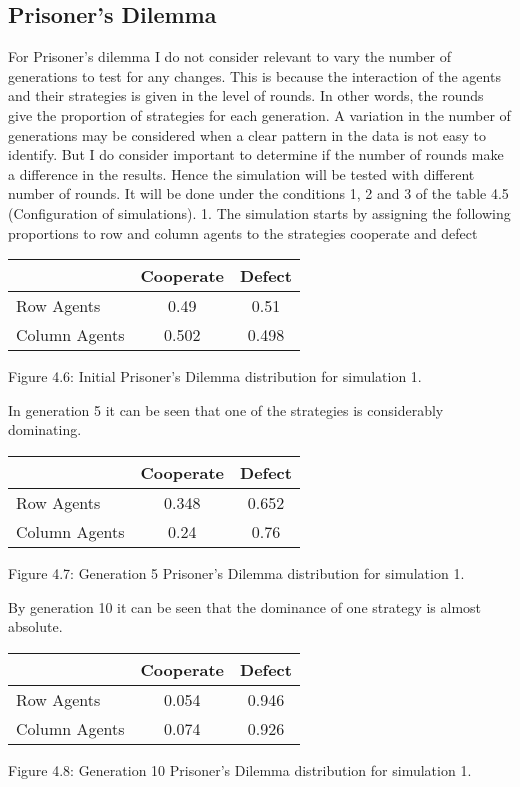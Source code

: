 \documentclass{article}
\begin{document}
\subsection{Prisoner's Dilemma}
For Prisoner's dilemma I do not consider relevant to vary the number of generations to test for any changes. This is because the interaction of the agents and their strategies is given in the level of rounds. In other words, the rounds give the proportion of strategies for each generation. A variation in the number of generations may be considered when a clear pattern in the data is not easy to identify. But I do consider important to determine if the number of rounds make a difference in the results. Hence the simulation will be tested  with different number of rounds. It will be done under the conditions 1, 2 and 3 of the table 4.5 (Configuration of simulations).
1.
The simulation starts by assigning the following proportions to row and column agents to the strategies cooperate and defect
\begin{center}
\begin{tabular}{|l|c|c|}
\hline
& Cooperate & Defect \\ 
\hline
Row Agents & 0.49 & 0.51\\
\hline
Column Agents & 0.502 & 0.498\\
\hline
\end{tabular}
\end{center}
\begin{center}
Figure 4.6: Initial Prisoner’s Dilemma distribution for simulation 1.
\end{center}

In generation 5 it can be seen that one of the strategies is considerably dominating.
\begin{center}
\begin{tabular}{|l|c|c|}
\hline
& Cooperate & Defect \\ 
\hline
Row Agents & 0.348 & 0.652\\
\hline
Column Agents & 0.24 & 0.76\\
\hline
\end{tabular}
\end{center}
\begin{center}
Figure 4.7: Generation 5 Prisoner’s Dilemma distribution for simulation 1.
\end{center}

By generation 10 it can be seen that the dominance of one strategy is almost absolute.

\begin{center}
\begin{tabular}{|l|c|c|}
\hline
& Cooperate & Defect \\ 
\hline
Row Agents & 0.054 & 0.946\\
\hline
Column Agents & 0.074 & 0.926\\
\hline
\end{tabular}
\end{center}
\begin{center}
Figure 4.8: Generation 10 Prisoner’s Dilemma distribution for simulation 1.
\end{center}
\end{document}
